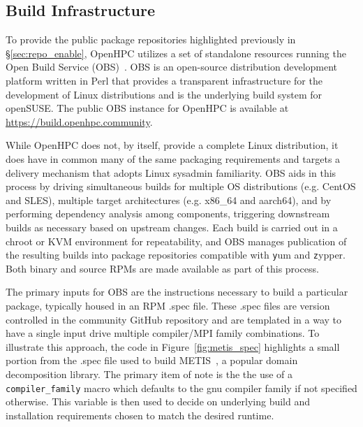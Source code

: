 \documentclass{sig-alternate-05-2015}
\begin{document}

\subsection{Build Infrastructure} \label{sec:build_infra}

To provide the public package repositories highlighted previously in
\S\ref{sec:repo_enable}, OpenHPC utilizes a set of standalone resources
running the Open Build Service (OBS)~\cite{OBS_url}.  OBS is an open-source
distribution development platform written in Perl that provides a transparent
infrastructure for the development of Linux distributions and is the underlying
build system for openSUSE.  The public OBS instance for OpenHPC is available at
\url{https://build.openhpc.community}.

While OpenHPC does not, by itself, provide a complete Linux distribution, it
does have in common many of the same packaging requirements and targets a
delivery mechanism that adopts Linux sysadmin familiarity.  OBS aids in this
process by driving simultaneous builds for multiple OS distributions (e.g.
CentOS and SLES), multiple target architectures (e.g. x86\_64 and aarch64),
and by performing dependency analysis among components, triggering downstream
builds as necessary based on upstream changes. Each build is carried out in a
chroot or KVM environment for repeatability, and OBS manages publication of the resulting
builds into package repositories compatible with {\texttt yum} and {\texttt
  zypper}. Both binary and source RPMs are made available as part of this process.

The primary inputs for OBS are the instructions necessary to build a particular
package, typically housed in an RPM .spec file. These .spec files are version controlled in the
community GitHub repository and are templated in a way to have a single input
drive multiple compiler/MPI family combinations.  To illustrate this approach,
the code in Figure~\ref{fig:metis_spec} highlights a small portion from the .spec file used to build
METIS~\cite{Karypis:1998}, a popular domain decomposition library. The primary
item of note is the the use of a \texttt{compiler\_family} macro which defaults
to the gnu compiler family if not specified otherwise.  This variable is then used
to decide on underlying build and installation requirements chosen to match the
desired runtime.
\end{document}

